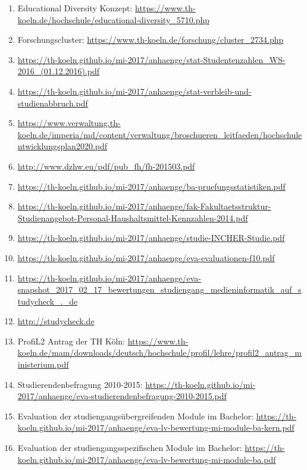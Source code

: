 \documentclass[BCOR12mm,DIV11,titlepage,a4paper,oneside,10pt]{scrbook}
\begin{document}
\begin{sloppypar}
\begin{flushleft}

\begin{enumerate}
\item{Educational Diversity Konzept: \url{https://www.th-koeln.de/hochschule/educational-diversity\_5710.php} } 
\item{Forschungscluster: \url{https://www.th-koeln.de/forschung/cluster\_2734.php} } 
\item{\url{https://th-koeln.github.io/mi-2017/anhaenge/stat-Studentenzahlen\_WS-2016\_(01.12.2016).pdf}} 
\item{\url{https://th-koeln.github.io/mi-2017/anhaenge/stat-verbleib-und-studienabbruch.pdf}} 
\item{\url{https://www.verwaltung.th-koeln.de/imperia/md/content/verwaltung/broschueren\_leitfaeden/hochschulentwicklungsplan2020.pdf}} 
\item{\url{http://www.dzhw.eu/pdf/pub\_fh/fh-201503.pdf}} 
\item{\url{https://th-koeln.github.io/mi-2017/anhaenge/ba-pruefungsstatistiken.pdf}} 
\item{\url{https://th-koeln.github.io/mi-2017/anhaenge/fak-Fakultaetsstruktur-Studienangebot-Personal-Haushaltsmittel-Kennzahlen-2014.pdf}} 
\item{\url{https://th-koeln.github.io/mi-2017/anhaenge/studie-INCHER-Studie.pdf}} 
\item{\url{https://th-koeln.github.io/mi-2017/anhaenge/eva-evaluationen-f10.pdf}} 
\item{\url{https://th-koeln.github.io/mi-2017/anhaenge/eva-snapshot\_2017\_02\_17\_bewertungen\_studiengang\_medieninformatik\_auf\_studycheck\_.\_de}} 
\item{\url{http://studycheck.de}} 
\item{ProfiL2 Antrag der TH Köln: \url{https://www.th-koeln.de/mam/downloads/deutsch/hochschule/profil/lehre/profil2\_antrag\_ministerium.pdf} } 
\item{Studierendenbefragung 2010-2015: \url{https://th-koeln.github.io/mi-2017/anhaenge/eva-studierendenbefragung-2010-2015.pdf} } 
\item{Evaluation der studiengangsübergreifenden Module im Bachelor: \url{https://th-koeln.github.io/mi-2017/anhaenge/eva-lv-bewertung-mi-module-ba-kern.pdf} } 
\item{Evaluation der studiengangsspezifischen Module im Bachelor: \url{https://th-koeln.github.io/mi-2017/anhaenge/eva-lv-bewertung-mi-module-ba.pdf} } 

\end{enumerate}
\end{flushleft}
\end{sloppypar}
\end{document}
